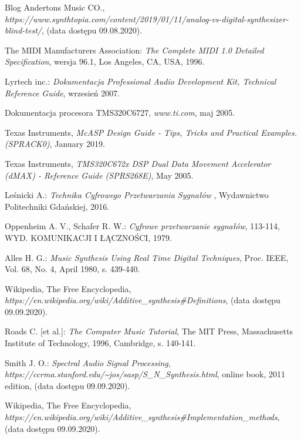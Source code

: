 \documentclass[nostrict]{szablonPG}
\begin{document}
\begin{thebibliography}{20}
		Blog Andertons Music CO., \emph{https://www.synthtopia.com/content/2019/01/11/analog-vs-digital-synthesizer-blind-test/}, (data dostępu 09.08.2020).
	
		The MIDI Manufacturers Association: \emph{The Complete MIDI 1.0 Detailed Specification}, wersja 96.1, Los Angeles, CA, USA, 1996.
		
		Lyrtech inc.: \emph{Dokumentacja Professional Audio Development Kit, Technical Reference Guide}, wrzesień 2007.
		
		Dokumentacja procesora TMS320C6727, \emph{www.ti.com}, maj 2005.
		
	    Texas Instruments, \emph{McASP Design Guide - Tips, Tricks and Practical Examples. (SPRACK0)}, January 2019.
		
		Texas Instruments, \emph{TMS320C672x DSP Dual Data Movement Accelerator (dMAX) - Reference Guide (SPRS268E)}, May 2005.
		
		Le\'snicki A.: \emph{Technika Cyfrowego Przetwarzania Sygna\l{}\'ow }, Wydawnictwo Politechniki Gda\'nskiej, 2016.
		
		Oppenheim A. V., Schafer R. W.: \emph{Cyfrowe przetwarzanie sygnałów}, 113-114, WYD. KOMUNIKACJI I ŁĄCZNOŚCI, 1979.
		
		Alles H. G.: \emph{Music Synthesis Using Real Time Digital Techniques}, Proc. IEEE, Vol. 68, No. 4, April 1980, s. 439-440.

		Wikipedia, The Free Encyclopedia, \emph{https://en.wikipedia.org/wiki/Additive\_synthesis\#Definitions}, (data dostępu 09.09.2020).
		
		Roads C. [et al.]: \emph{The Computer Music Tutorial}, The MIT Press, Massachusetts Institute of Technology, 1996, Cambridge, s. 140-141.
		
		Smith J. O.: \emph{Spectral Audio Signal Processing}, \emph{https://ccrma.stanford.edu/\textasciitilde jos/sasp/S\_N\_Synthesis.html}, online book, 2011 edition, (data dostępu 09.09.2020).
		
		Wikipedia, The Free Encyclopedia,
		\emph{https://en.wikipedia.org/wiki/Additive\_synthesis\#Implementation\_methods}, (data dostępu 09.09.2020).
		

\end{thebibliography}
\end{document}
